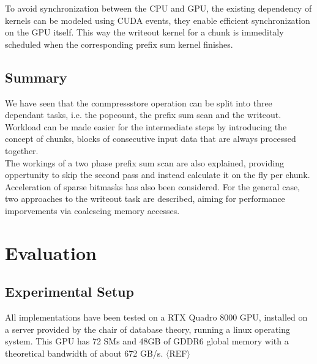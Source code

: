 \documentclass{tudscrreprt}
\newcommand{\markr}[1]{\textcolor{review}{$\langle$#1$\rangle$}}
\begin{document}
			To avoid synchronization between the CPU and GPU, the existing dependency of kernels can be modeled using CUDA events, they enable efficient synchronization on the GPU itself. This way the writeout kernel for a chunk is immeditaly scheduled when the corresponding prefix sum kernel finishes. \\
		
		\section{Summary}
			We have seen that the conmpressstore operation can be split into three dependant tasks, i.e. the popcount, the prefix sum scan and the writeout. Workload can be made easier for the intermediate steps by introducing the concept of chunks, blocks of consecutive input data that are always processed together. \\
			The workings of a two phase prefix sum scan are also explained, providing oppertunity to skip the second pass and instead calculate it on the fly per chunk. \\
			Acceleration of sparse bitmasks has also been considered. For the general case, two approaches to the writeout task are described, aiming for performance imporvements via coalescing memory accesses. \\
		
	\chapter{Evaluation}
	
		\section{Experimental Setup}
			All implementations have been tested on a RTX Quadro 8000 GPU, installed on a server provided by the chair of database theory, running a linux operating system. This GPU has 72 SMs and 48GB of GDDR6 global memory with a theoretical bandwidth of about 672 GB/s. \markr{REF} \\
			
\end{document}
